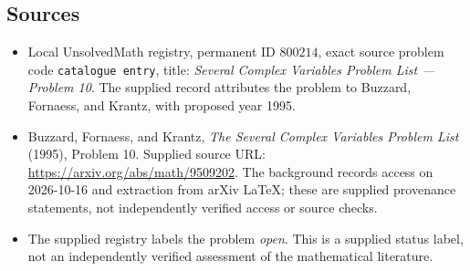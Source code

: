 \documentclass[11pt]{article}
\begin{document}
\subsection{Sources}
\begin{itemize}
\item Local UnsolvedMath registry, permanent ID \(800214\), exact source problem code \texttt{catalogue entry}, title: \emph{Several Complex Variables Problem List --- Problem 10}. The supplied record attributes the problem to Buzzard, Fornaess, and Krantz, with proposed year 1995.
\item Buzzard, Fornaess, and Krantz, \emph{The Several Complex Variables Problem List} (1995), Problem 10. Supplied source URL: \url{https://arxiv.org/abs/math/9509202}. The background records access on 2026-10-16 and extraction from arXiv LaTeX; these are supplied provenance statements, not independently verified access or source checks.
\item The supplied registry labels the problem \emph{open}. This is a supplied status label, not an independently verified assessment of the mathematical literature.
\end{itemize}
\end{document}

